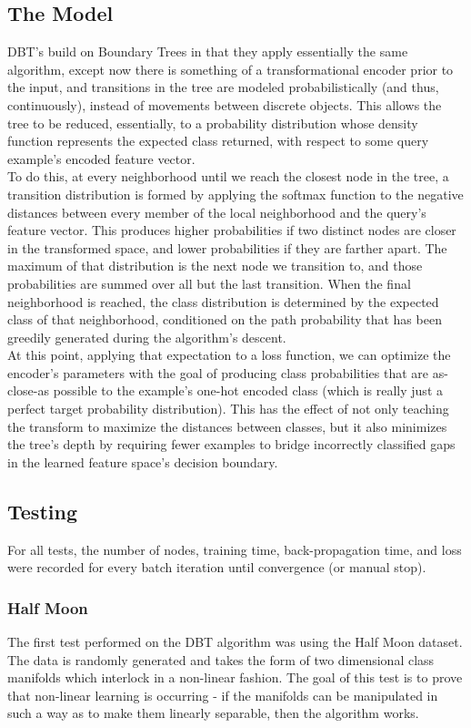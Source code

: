 \documentclass[10pt,letterpaper,twocolumn]{article}
\begin{document}
		\subsection{The Model}
			DBT's build on Boundary Trees in that they apply essentially the same algorithm, except now there is something of a transformational encoder prior to the input, and transitions in the tree are modeled probabilistically (and thus, continuously), instead of movements between discrete objects. This allows the tree to be reduced, essentially, to a probability distribution whose density function represents the expected class returned, with respect to some query example's encoded feature vector.\\
			To do this, at every neighborhood until we reach the closest node in the tree, a transition distribution is formed by applying the softmax function to the negative distances between every member of the local neighborhood and the query's feature vector. This produces higher probabilities if two distinct nodes are closer in the transformed space, and lower probabilities if they are farther apart. The maximum of that distribution is the next node we transition to, and those probabilities are summed over all but the last transition. When the final neighborhood is reached, the class distribution is determined by the expected class of that neighborhood, conditioned on the path probability that has been greedily generated during the algorithm's descent.\\
			At this point, applying that expectation to a loss function, we can optimize the encoder's parameters with the goal of producing class probabilities that are as-close-as possible to the example's one-hot encoded class (which is really just a perfect target probability distribution). This has the effect of not only teaching the transform to maximize the distances between classes, but it also minimizes the tree's depth by requiring fewer examples to bridge incorrectly classified gaps in the learned feature space's decision boundary. 
			
		\subsection{Testing}
			For all tests, the number of nodes, training time, back-propagation time, and loss were recorded for every batch iteration until convergence (or manual stop). 
			\subsubsection{Half Moon}
			The first test performed on the DBT algorithm was using the Half Moon dataset. \\
			The data is randomly generated and takes the form of two dimensional class manifolds which interlock in a non-linear fashion. The goal of this test is to prove that non-linear learning is occurring - if the manifolds can be manipulated in such a way as to make them linearly separable, then the algorithm works. 
\end{document}
